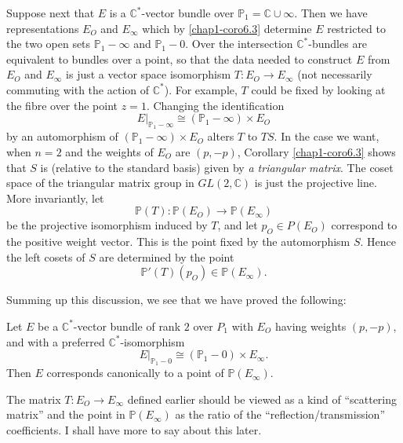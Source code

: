 Suppose next that $E$ is a $\mathbb{C}^{*}$-vector bundle over
$\mathbb{P}_{1}=\mathbb{C}\cup \infty$. Then we have representations
$E_{O}$ and $E_{\infty}$ which by \eqref{chap1-coro6.3}
determine $E$ restricted to the two open sets $\mathbb{P}_{1}-\infty$
and $\mathbb{P}_{1}-0$. Over the intersection $\mathbb{C}^{*}$-bundles
are equivalent to bundles over a point, so that the data needed to
construct $E$ from $E_{O}$ and $E_{\infty}$ is just a vector space
isomorphism $T:E_{O}\to E_{\infty}$ (not necessarily commuting with
the action of $\mathbb{C}^{*}$). For example, $T$ could be fixed by
looking at the fibre over the point $z=1$. Changing the identification
$$
E|_{\mathbb{P}_{1}-\infty}\cong (\mathbb{P}_{1}-\infty)\times E_{O}
$$
by an automorphism of $(\mathbb{P}_{1}-\infty)\times E_{O}$ alters $T$
to $TS$. In the case we want, when $n=2$ and the weights of $E_{O}$
are $(p,-p)$, Corollary \eqref{chap1-coro6.3} shows that $S$ is
(relative to the standard basis) given by {\em a triangular
  matrix}. The coset space of the triangular matrix group in
$GL(2,\mathbb{C})$ is just the projective line. More invariantly, let
$$
\mathbb{P}(T):\mathbb{P}(E_{O})\to \mathbb{P}(E_{\infty})
$$
be the projective isomorphism induced by $T$, and let $p_{O}\in
P(E_{O})$ correspond to the positive weight vector. This is the point
fixed by the automorphism $S$. Hence the left cosets of $S$ are
determined by the point
\setcounter{equation}{3}
\begin{equation}
\mathbb{P}'(T)(p_{O})\in \mathbb{P}(E_{\infty}).\label{chap1-eq6.4}
\end{equation}\pageoriginale

Summing up this discussion, we see that we have proved the following:

\setcounter{theorem}{4}
\begin{proposition}\label{chap1-prop6.5}
Let $E$ be a $\mathbb{C}^{*}$-vector bundle of rank $2$ over $P_{1}$
with $E_{O}$ having weights $(p,-p)$, and with a preferred
$\mathbb{C}^{*}$-isomorphism
$$
E|_{\mathbb{P}_{1}-0}\cong (\mathbb{P}_{1}-0)\times E_{\infty}. 
$$
Then $E$ corresponds canonically to a point of
$\mathbb{P}(E_{\infty})$. 
\end{proposition}

\begin{remark*}
The matrix $T:E_{O}\to E_{\infty}$ defined earlier should be viewed as
a kind of ``scattering matrix'' and the point in
$\mathbb{P}(E_{\infty})$ as the ratio of the
``reflection/transmission'' coefficients. I shall have more to say
about this later. 
\end{remark*}

